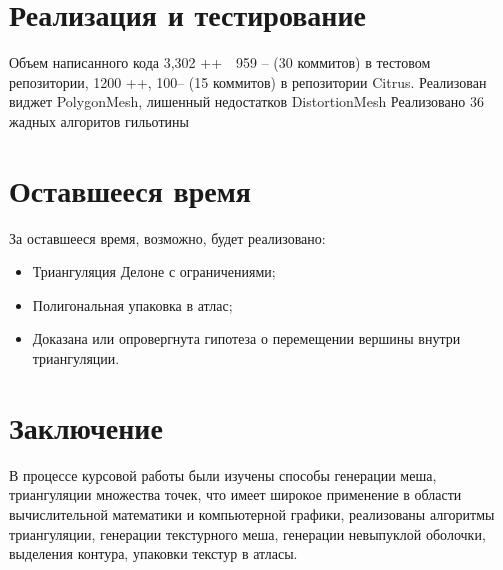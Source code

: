\documentclass{fefu}
\begin{document}
\section{Реализация и тестирование}
Объем написанного кода 3,302 ++  959 -- (30 коммитов) в тестовом репозитории, 1200 ++, 100-- (15 коммитов) в репозитории Citrus.
Реализован виджет PolygonMesh, лишенный недостатков DistortionMesh
Реализовано 36 жадных алгоритов гильотины
\section*{Оставшееся время}
За оставшееся время, возможно, будет реализовано:
\begin{itemize}
    \item Триангуляция Делоне с ограничениями;
    \item Полигональная упаковка в атлас;
    \item Доказана или опровергнута гипотеза о перемещении вершины внутри триангуляции.
\end{itemize}
\section*{Заключение}
В процессе курсовой работы были изучены способы генерации меша, триангуляции множества точек, что имеет широкое 
применение в области вычислительной математики и компьютерной графики, реализованы алгоритмы триангуляции, генерации 
текстурного меша, генерации невыпуклой оболочки, выделения контура, упаковки текстур в атласы.
\newpage


\end{document}
